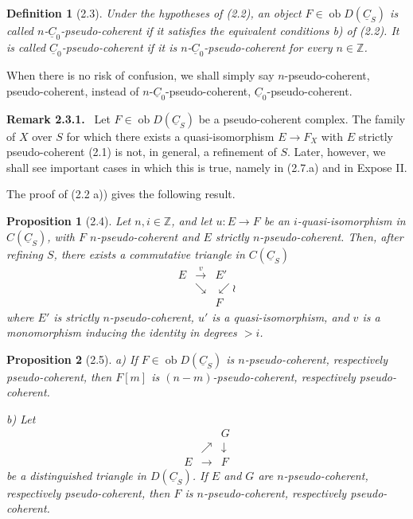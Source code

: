 \documentclass[13pt]{extarticle}
\newcommand{\ZZ}{\mathbb Z}
\newcommand{\uC}{\underline C}
\newcommand{\ob}{\operatorname{ob}}
\newenvironment{remarktext}[1][Remark]{\par\noindent\textbf{#1.}\ }{\par\medskip}
\newtheorem*{proposition*}{Proposition}
\newtheorem*{definition*}{Definition}
\begin{document}
\begin{definition*}[2.3]
Under the hypotheses of (2.2), an object $F\in\ob D(\uC_S)$ is called \emph{$n$-$\uC_0$-pseudo-coherent} if it satisfies the equivalent conditions b) of (2.2). It is called \emph{$\uC_0$-pseudo-coherent} if it is $n$-$\uC_0$-pseudo-coherent for every $n\in\ZZ$.
\end{definition*}

When there is no risk of confusion, we shall simply say $n$-pseudo-coherent, pseudo-coherent, instead of $n$-$\uC_0$-pseudo-coherent, $\uC_0$-pseudo-coherent.

\begin{remarktext}[Remark 2.3.1]
Let $F\in\ob D(\uC_S)$ be a pseudo-coherent complex. The family of $X$ over $S$ for which there exists a quasi-isomorphism $E\to F_X$ with $E$ strictly pseudo-coherent (2.1) is not, in general, a refinement of $S$. Later, however, we shall see important cases in which this is true, namely in (2.7.a) and in Expose II.
\end{remarktext}

The proof of (2.2 a)) gives the following result.

\begin{proposition*}[2.4]
Let $n,i\in\ZZ$, and let $u:E\to F$ be an $i$-quasi-isomorphism in $C(\uC_S)$, with $F$ $n$-pseudo-coherent and $E$ strictly $n$-pseudo-coherent. Then, after refining $S$, there exists a commutative triangle in $C(\uC_S)$
\[
\begin{array}{ccc}
E & \xrightarrow{v} & E'\\
& \searrow & \swarrow\wr\\
&& F
\end{array}
\]
where $E'$ is strictly $n$-pseudo-coherent, $u'$ is a quasi-isomorphism, and $v$ is a monomorphism inducing the identity in degrees $>i$.
\end{proposition*}

\begin{proposition*}[2.5]
\textup{a)} If $F\in\ob D(\uC_S)$ is $n$-pseudo-coherent, respectively pseudo-coherent, then $F[m]$ is $(n-m)$-pseudo-coherent, respectively pseudo-coherent.

\textup{b)} Let
\[
\begin{array}{ccc}
&&G\\
& \nearrow & \downarrow\\
E&\longrightarrow&F
\end{array}
\]
be a distinguished triangle in $D(\uC_S)$. If $E$ and $G$ are $n$-pseudo-coherent, respectively pseudo-coherent, then $F$ is $n$-pseudo-coherent, respectively pseudo-coherent.
\end{proposition*}
\end{document}
